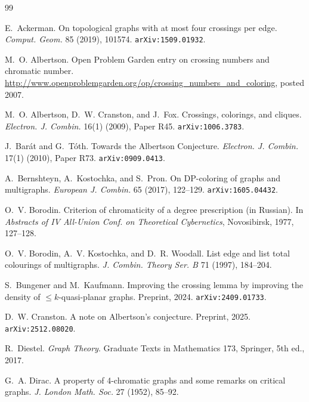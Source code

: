 \documentclass[11pt,a4paper]{article}
\theoremstyle{definition}
\begin{document}
\begin{thebibliography}{99}

E.~Ackerman.
\newblock On topological graphs with at most four crossings per edge.
\newblock \emph{Comput. Geom.} 85 (2019), 101574.
\newblock \texttt{arXiv:1509.01932}.

M.~O. Albertson.
\newblock Open Problem Garden entry on crossing numbers and chromatic number.
\newblock \url{http://www.openproblemgarden.org/op/crossing_numbers_and_coloring},
posted 2007.

M.~O. Albertson, D.~W. Cranston, and J.~Fox.
\newblock Crossings, colorings, and cliques.
\newblock \emph{Electron. J. Combin.} 16(1) (2009), Paper R45.
\newblock \texttt{arXiv:1006.3783}.

J.~Bar\'at and G.~T\'oth.
\newblock Towards the Albertson Conjecture.
\newblock \emph{Electron. J. Combin.} 17(1) (2010), Paper R73.
\newblock \texttt{arXiv:0909.0413}.

A.~Bernshteyn, A.~Kostochka, and S.~Pron.
\newblock On DP-coloring of graphs and multigraphs.
\newblock \emph{European J. Combin.} 65 (2017), 122--129.
\newblock \texttt{arXiv:1605.04432}.

O.~V. Borodin.
\newblock Criterion of chromaticity of a degree prescription (in Russian).
\newblock In \emph{Abstracts of IV All-Union Conf. on Theoretical
Cybernetics}, Novosibirsk, 1977, 127--128.

O.~V. Borodin, A.~V. Kostochka, and D.~R. Woodall.
\newblock List edge and list total colourings of multigraphs.
\newblock \emph{J. Combin. Theory Ser. B} 71 (1997), 184--204.

S.~Bungener and M.~Kaufmann.
\newblock Improving the crossing lemma by improving the
density of $\le k$-quasi-planar graphs.
\newblock Preprint, 2024.
\newblock \texttt{arXiv:2409.01733}.

D.~W. Cranston.
\newblock A note on Albertson's conjecture.
\newblock Preprint, 2025.
\newblock \texttt{arXiv:2512.08020}.

R.~Diestel.
\newblock \emph{Graph Theory}.
\newblock Graduate Texts in Mathematics 173, Springer, 5th ed., 2017.

G.~A. Dirac.
\newblock A property of 4-chromatic graphs and some remarks on
critical graphs.
\newblock \emph{J. London Math. Soc.} 27 (1952), 85--92.


\end{thebibliography}
\end{document}

